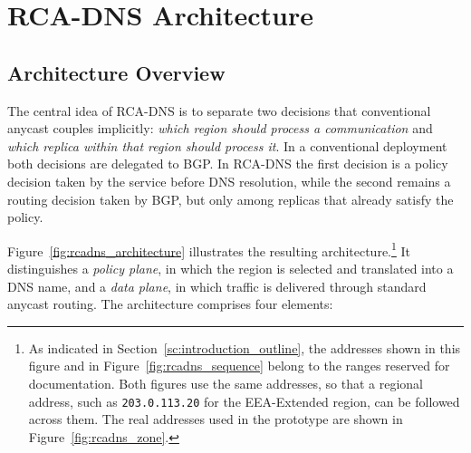 \section{RCA-DNS Architecture}
\label{sc:rcadns_architecture}

\subsection{Architecture Overview}
\label{sc:rcadns_overview}

The central idea of RCA-DNS is to separate two decisions that conventional anycast couples implicitly: \textit{which region should process a communication} and \textit{which replica within that region should process it}. In a conventional deployment both decisions are delegated to BGP. In RCA-DNS the first decision is a policy decision taken by the service before DNS resolution, while the second remains a routing decision taken by BGP, but only among replicas that already satisfy the policy.

Figure~\ref{fig:rcadns_architecture} illustrates the resulting architecture.\footnote{As indicated in Section~\ref{sc:introduction_outline}, the addresses shown in this figure and in Figure~\ref{fig:rcadns_sequence} belong to the ranges reserved for documentation. Both figures use the same addresses, so that a regional address, such as \texttt{203.0.113.20} for the EEA-Extended region, can be followed across them. The real addresses used in the prototype are shown in Figure~\ref{fig:rcadns_zone}.} It distinguishes a \textit{policy plane}, in which the region is selected and translated into a DNS name, and a \textit{data plane}, in which traffic is delivered through standard anycast routing. The architecture comprises four elements:

